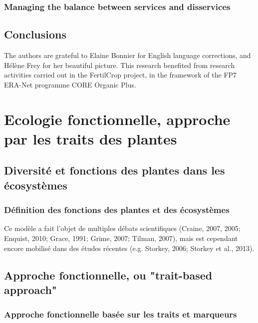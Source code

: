 \subsubsection{Managing the balance between services and disservices}


\subsection{Conclusions}

The authors are grateful to Elaine Bonnier for English language corrections, and Hélène Frey for her beautiful picture. This research benefited from research activities carried out in the FertilCrop project, in the framework of the FP7 ERA-Net programme CORE Organic Plus. 

\newpage

\section{Ecologie fonctionnelle, approche par les traits des plantes}

\subsection{Diversité et fonctions des plantes dans les écosystèmes}

\subsubsection{Définition des fonctions des plantes et des écosystèmes}

Ce modèle a fait l'objet de multiples débats scientifiques (Craine, 2007, 2005; Enquist, 2010; Grace, 1991; Grime, 2007; Tilman, 2007), mais est cependant encore mobilisé dans des études récentes (e.g. Storkey, 2006; Storkey et al., 2013). 

\subsection{Approche fonctionnelle, ou "trait-based approach"}


\subsubsection{Approche fonctionnelle basée sur les traits et marqueurs}

